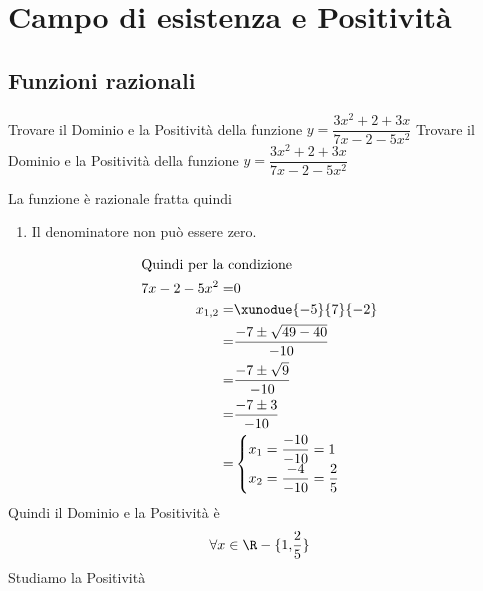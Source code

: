 \chapter{Campo di esistenza e Positività}
\tcbstartrecording
\section{Funzioni razionali}
\begin{exercise}
	Trovare il Dominio e la Positività della funzione $y=\dfrac{3x^2+2+3x}{7x-2-5x^2} $
	\tcblower
	Trovare il Dominio e la Positività della funzione $y=\dfrac{3x^2+2+3x}{7x-2-5x^2} $
	
	La funzione è razionale fratta quindi
		\begin{enumerate}
		\item Il denominatore non può essere zero.
	\end{enumerate}
\begin{align*}
\intertext{Quindi per la condizione}
7x-2-5x^2=&0\\
x_{1,2}=&\xunodue{-5}{7}{-2}\\
=&\dfrac{-7\pm\sqrt{49-40}}{-10}\\
=&\dfrac{-7\pm \sqrt{9}}{-10}\\
=&\dfrac{-7\pm 3}{-10}\\
=&\begin{cases}
x_1=\dfrac{-10}{-10}=1\\
x_2=\dfrac{-4}{-10}=\dfrac{2}{5}
\end{cases}\\
\end{align*}
Quindi il Dominio e la Positività è 
\begin{align*}
\forall x\in\R-\lbrace 1,&\dfrac{2}{5}\rbrace\\
\end{align*}
Studiamo la Positività


\end{exercise}
